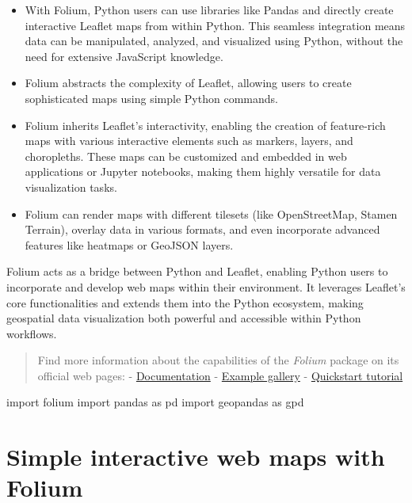 \documentclass[
  letterpaper,
  DIV=11,
  numbers=noendperiod]{scrreprt}
\newenvironment{Shaded}{\begin{snugshade}}{\end{snugshade}}
\newcommand{\ImportTok}[1]{\textcolor[rgb]{0.00,0.46,0.62}{#1}}
\newcommand{\NormalTok}[1]{\textcolor[rgb]{0.00,0.23,0.31}{#1}}
\providecommand{\tightlist}{%
  \setlength{\itemsep}{0pt}\setlength{\parskip}{0pt}}\usepackage{longtable,booktabs,array}
\begin{document}
\begin{itemize}
\tightlist
\item
  With Folium, Python users can use libraries like Pandas and directly
  create interactive Leaflet maps from within Python. This seamless
  integration means data can be manipulated, analyzed, and visualized
  using Python, without the need for extensive JavaScript knowledge.
\item
  Folium abstracts the complexity of Leaflet, allowing users to create
  sophisticated maps using simple Python commands.
\item
  Folium inherits Leaflet's interactivity, enabling the creation of
  feature-rich maps with various interactive elements such as markers,
  layers, and choropleths. These maps can be customized and embedded in
  web applications or Jupyter notebooks, making them highly versatile
  for data visualization tasks.
\item
  Folium can render maps with different tilesets (like OpenStreetMap,
  Stamen Terrain), overlay data in various formats, and even incorporate
  advanced features like heatmaps or GeoJSON layers.
\end{itemize}

Folium acts as a bridge between Python and Leaflet, enabling Python
users to incorporate and develop web maps within their environment. It
leverages Leaflet's core functionalities and extends them into the
Python ecosystem, making geospatial data visualization both powerful and
accessible within Python workflows.

\begin{quote}
Find more information about the capabilities of the \emph{Folium}
package on its official web pages: -
\href{https://python-visualization.github.io/folium/}{Documentation} -
\href{https://nbviewer.org/github/python-visualization/folium/tree/main/examples/}{Example
gallery} -
\href{https://python-visualization.github.io/folium/quickstart.html\#Getting-Started}{Quickstart
tutorial}
\end{quote}

\begin{Shaded}
\begin{Highlighting}[]
\ImportTok{import}\NormalTok{ folium}
\ImportTok{import}\NormalTok{ pandas }\ImportTok{as}\NormalTok{ pd}
\ImportTok{import}\NormalTok{ geopandas }\ImportTok{as}\NormalTok{ gpd}
\end{Highlighting}
\end{Shaded}

\section{Simple interactive web maps with
Folium}\label{simple-interactive-web-maps-with-folium}
\end{document}
